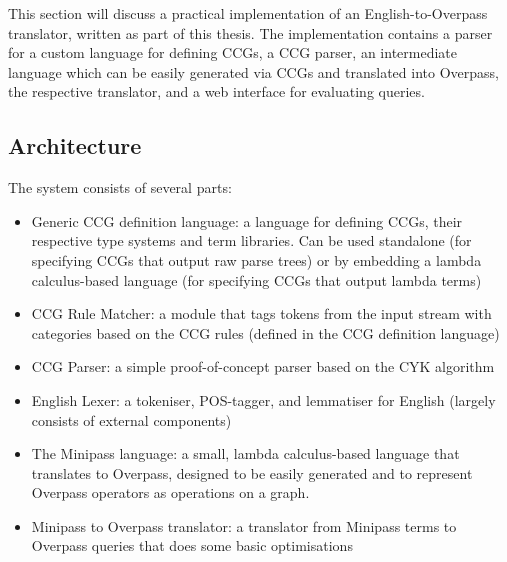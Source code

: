 \documentclass[main.tex]{subfiles}
\begin{document}

This section will discuss a practical implementation of an English-to-Overpass
translator, written as part of this thesis. The implementation contains a
parser for a custom language for defining CCGs, a CCG parser, an intermediate
language which can be easily generated via CCGs and translated into Overpass,
the respective translator, and a web interface for evaluating queries.

\subsection{Architecture}
The system consists of several parts:


\begin{itemize}
    \item Generic CCG definition language: a language for defining CCGs,
          their respective type systems and term libraries. Can be used
          standalone (for specifying CCGs that output raw parse trees)
          or by embedding a lambda calculus-based language (for specifying
          CCGs that output lambda terms)

    \item CCG Rule Matcher: a module that tags tokens from the input stream
          with categories based on the CCG rules (defined in the CCG definition
          language)

    \item CCG Parser: a simple proof-of-concept parser based on the CYK
          algorithm

    \item English Lexer: a tokeniser, POS-tagger, and lemmatiser for English
          (largely consists of external components)

    \item The Minipass language: a small, lambda calculus-based language
          that translates to Overpass, designed to be easily generated and
          to represent Overpass operators as operations on a graph.

    \item Minipass to Overpass translator: a translator from Minipass terms
          to Overpass queries that does some basic optimisations
\end{itemize}
\end{document}

